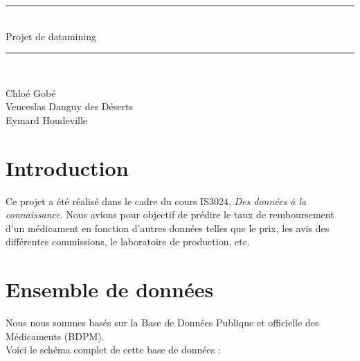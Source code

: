 \documentclass[a4paper, 12pt]{article}
\begin{document}
\begin{titlepage}
\newcommand{\HRule}{\rule{\linewidth}{0.5mm}}

\begin{center}

\HRule \\[0.4cm]
{ \huge Projet de datamining}\\[0.4cm]
\HRule \\[2cm]

\vspace{2cm}

Chloé Gobé \\
Venceslas Danguy des Déserts \\ 
Eymard Houdeville


\vspace{2cm}


\end{center}
\end{titlepage}


\tableofcontents
\newpage

\section*{Introduction}

Ce projet a été réalisé dans le cadre du cours IS3024, \textit{Des données à la connaissance}. Nous avions pour objectif de prédire le taux de remboursement d'un médicament en fonction d'autres données telles que le prix, les avis des différentes commissions, le laboratoire de production, etc. 

\section{Ensemble de données}

Nous nous sommes basés sur la Base de Données Publique et officielle des Médicaments \cite{database} (BDPM). \\

Voici le schéma complet de cette base de données :
\end{document}

